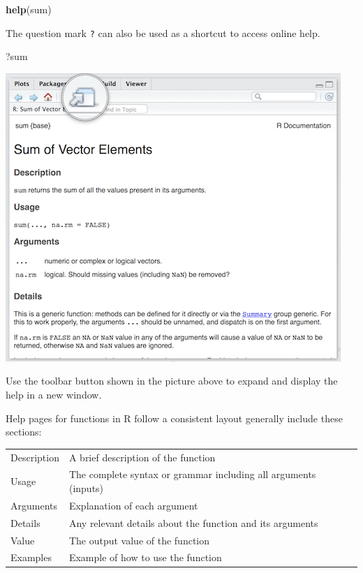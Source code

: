 \documentclass[]{article}
\newenvironment{Shaded}{\begin{snugshade}}{\end{snugshade}}
\newcommand{\KeywordTok}[1]{\textcolor[rgb]{0.13,0.29,0.53}{\textbf{#1}}}
\newcommand{\NormalTok}[1]{#1}
\begin{document}
\begin{Shaded}
\begin{Highlighting}[]
\KeywordTok{help}\NormalTok{(sum)}
\end{Highlighting}
\end{Shaded}

The question mark \texttt{?} can also be used as a shortcut to access online help.

\begin{Shaded}
\begin{Highlighting}[]
\NormalTok{?sum}
\end{Highlighting}
\end{Shaded}

\includegraphics{./img/rstudio_help.png}

Use the toolbar button shown in the picture above to expand and display the help in a new window.

Help pages for functions in R follow a consistent layout generally include these sections:

\begin{longtable}[]{@{}ll@{}}
\toprule
\endhead
Description & A brief description of the function\tabularnewline
Usage & The complete syntax or grammar including all arguments (inputs)\tabularnewline
Arguments & Explanation of each argument\tabularnewline
Details & Any relevant details about the function and its arguments\tabularnewline
Value & The output value of the function\tabularnewline
Examples & Example of how to use the function\tabularnewline
\bottomrule
\end{longtable}
\end{document}
